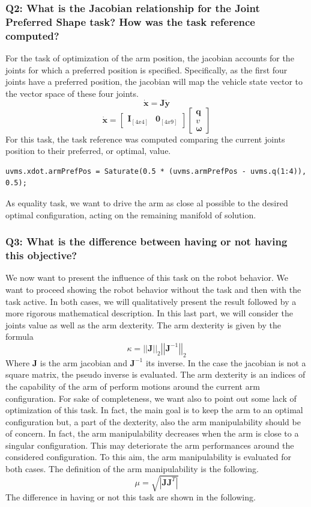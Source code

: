\documentclass{article}
\begin{document}
\subsubsection{Q2: What is the Jacobian relationship for the Joint Preferred Shape task? How was the task reference computed?}
For the task of optimization of the arm position, the jacobian accounts for the joints for which a preferred position is specified. Specifically, as the first four joints have a preferred position, the jacobian will map the vehicle state vector to the vector space of these four joints. 
$$
	\bm{\dot{x}} = \bm{J}\bm{\dot{y}}
$$ $$	
	\bm{\dot{x}} = \begin{bmatrix} \bm{I}_{[4x4]} & \bm{0}_{[4x9]} \end{bmatrix}         
	\begin{bmatrix} \bm{q}    \\ \bm{\textit{v}} \\ \bm{\omega} \end{bmatrix} 	   
$$
For this task, the task reference was computed comparing the current joints position to their preferred, or optimal, value. 
\begin{lstlisting}
uvms.xdot.armPrefPos = Saturate(0.5 * (uvms.armPrefPos - uvms.q(1:4)), 0.5);
\end{lstlisting}
As equality task, we want to drive the arm as close al possible to the desired optimal configuration, acting on the remaining manifold of solution. 

\subsubsection{Q3: What is the difference between having or not having this objective?}
We now want to present the influence of this task on the robot behavior. We want to proceed showing the robot behavior without the task and then with the task active. In both cases, we will qualitatively present the result followed by a more rigorous mathematical description. In this last part, we will consider the joints value as well as the arm dexterity. The arm dexterity is given by the formula
$$ \kappa = \left|\left| \bm{J} \right|\right|_2 \left|\left| \bm{J}^{-1} \right|\right|_2
$$
Where $\bm{J}$ is the arm jacobian and $\bm{J}^{-1}$ its inverse. In the case the jacobian is not a square matrix, the pseudo inverse is evaluated. 
The arm dexterity is an indices of the capability of the arm of perform motions around the current arm configuration. 
For sake of completeness, we want also to point out some lack of optimization of this task. In fact, the main goal is to keep the arm to an optimal configuration but, a part of the dexterity, also the arm manipulability should be of concern. In fact, the arm manipulability decreases when the arm is close to a singular configuration. This may deteriorate the arm performances around the considered configuration. To this aim, the arm manipulability is evaluated for both cases. The definition of the arm manipulability is the following. 
$$
	\mu = \sqrt{\left| \bm{J} \bm{J}^T \right|}
$$
The difference in having or not this task are shown in the following. \\
\end{document}
